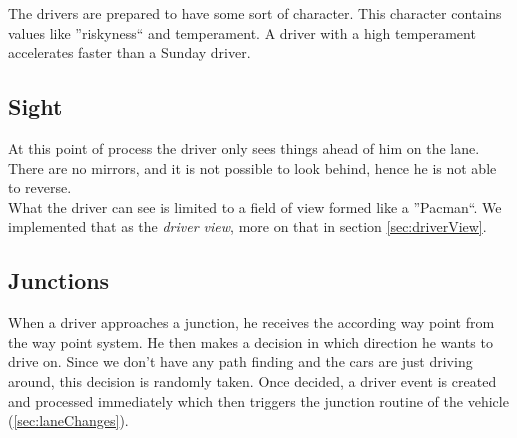 The drivers are prepared to have some sort of character. This character
contains values like ''riskyness`` and temperament. A driver with a
high temperament accelerates faster than a Sunday driver.

\subsection{Sight}
\label{sec:sight}

At this point of process the driver only sees things ahead of him on the
lane. There are no mirrors, and it is not possible to look behind, hence
he is not able to reverse.\\

\noindent What the driver can see is limited to a field of view formed like 
a ''Pacman``. We implemented that as the \emph{driver view}, more on that in 
section \ref{sec:driverView}.

\subsection{Junctions}
\label{sec:driverJunctions}

When a driver approaches a junction, he receives the according way point
from the way point system. He then makes a decision in which direction he
wants to drive on. Since we don't have any path finding and the cars are
just driving around, this decision is randomly taken. Once decided, a
driver event is created and processed immediately which then triggers
the junction routine of the vehicle (\ref{sec:laneChanges}).

